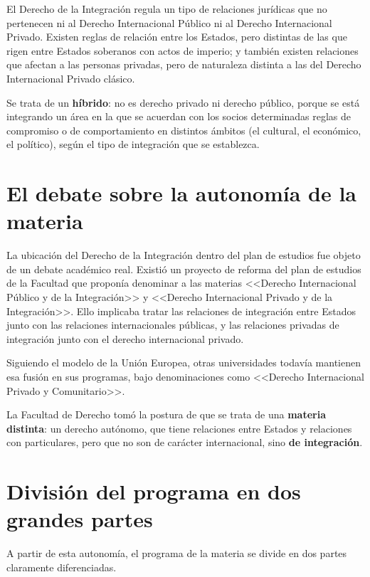 \documentclass[12pt,oneside]{book}
\begin{document}
El Derecho de la Integración regula un tipo de relaciones jurídicas que no pertenecen ni al Derecho Internacional Público ni al Derecho Internacional Privado. Existen reglas de relación entre los Estados, pero distintas de las que rigen entre Estados soberanos con actos de imperio; y también existen relaciones que afectan a las personas privadas, pero de naturaleza distinta a las del Derecho Internacional Privado clásico.

Se trata de un \textbf{híbrido}: no es derecho privado ni derecho público, porque se está integrando un área en la que se acuerdan con los socios determinadas reglas de compromiso o de comportamiento en distintos ámbitos (el cultural, el económico, el político), según el tipo de integración que se establezca.

\section{El debate sobre la autonomía de la materia}

La ubicación del Derecho de la Integración dentro del plan de estudios fue objeto de un debate académico real. Existió un proyecto de reforma del plan de estudios de la Facultad que proponía denominar a las materias <<Derecho Internacional Público y de la Integración>> y <<Derecho Internacional Privado y de la Integración>>. Ello implicaba tratar las relaciones de integración entre Estados junto con las relaciones internacionales públicas, y las relaciones privadas de integración junto con el derecho internacional privado.

Siguiendo el modelo de la Unión Europea, otras universidades todavía mantienen esa fusión en sus programas, bajo denominaciones como <<Derecho Internacional Privado y Comunitario>>.

\begin{important}
La Facultad de Derecho tomó la postura de que se trata de una \textbf{materia distinta}: un derecho autónomo, que tiene relaciones entre Estados y relaciones con particulares, pero que no son de carácter internacional, sino \textbf{de integración}.
\end{important}

\section{División del programa en dos grandes partes}

A partir de esta autonomía, el programa de la materia se divide en dos partes claramente diferenciadas.
\end{document}
